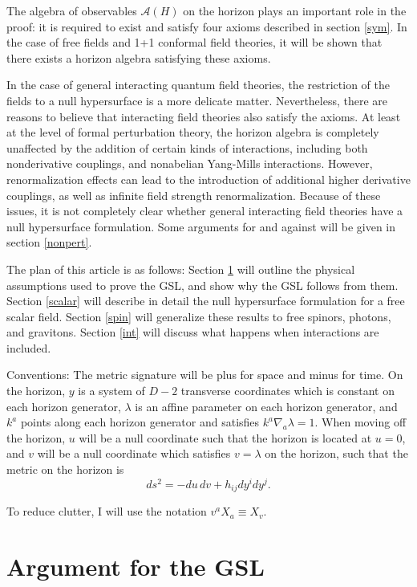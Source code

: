 \documentclass[12pt]{article}
\begin{document}
The algebra of observables $\mathcal{A}(H)$ on the horizon plays an important role in the proof: it is required to exist and satisfy four axioms described in section \ref{sym}.  In the case of free fields and 1+1 conformal field theories, it will be shown that there exists a horizon algebra satisfying these axioms.

In the case of general interacting quantum field theories, the restriction of the fields to a null hypersurface is a more delicate matter.  Nevertheless, there are reasons to believe that interacting field theories also satisfy the axioms.  At least at the level of formal perturbation theory, the horizon algebra is completely unaffected by the addition of certain kinds of interactions, including both nonderivative couplings, and nonabelian Yang-Mills interactions.  However, renormalization effects can lead to the introduction of additional higher derivative couplings, as well as infinite field strength renormalization.  Because of these issues, it is not completely clear whether general interacting field theories have a null hypersurface formulation.  Some arguments for and against will be given in section \ref{nonpert}.

The plan of this article is as follows: Section \ref{arg} will outline the physical assumptions used to prove the GSL, and show why the GSL follows from them.  Section \ref{scalar} will describe in detail the null hypersurface formulation for a free scalar field.  Section \ref{spin} will generalize these results to free spinors, photons, and gravitons.  Section \ref{int} will discuss what happens when interactions are included.

Conventions: The metric signature will be plus for space and minus for time.  On the horizon, $y$ is a system of $D-2$ transverse coordinates which is constant on each horizon generator, $\lambda$ is an affine parameter on each horizon generator, and $k^a$ points along each horizon generator and satisfies $k^a \nabla_a \lambda = 1$.  When moving off the horizon, $u$ will be a null coordinate such that the horizon is located at $u = 0$, and $v$ will be a null coordinate which satisfies $v = \lambda$ on the horizon, such that the metric on the horizon is
\begin{equation}
ds^2 = -du\,dv + h_{ij} dy^i dy^j.
\end{equation}

To reduce clutter, I will use the notation $v^a X_a \equiv X_v$.

\section{Argument for the GSL}\label{arg}
\end{document}
